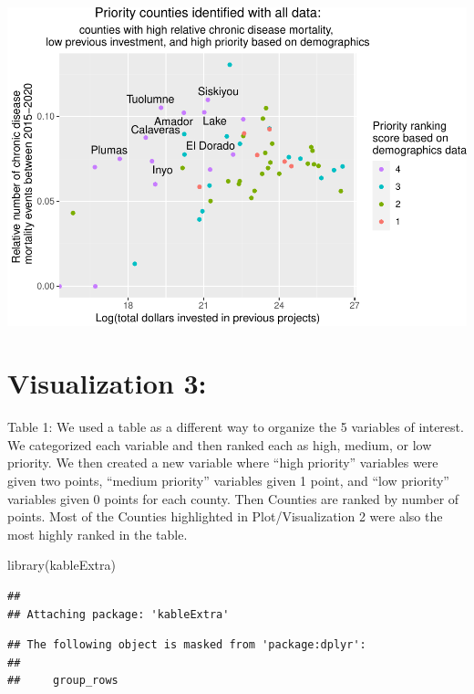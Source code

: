 \documentclass[
]{article}
\newenvironment{Shaded}{\begin{snugshade}}{\end{snugshade}}
\newcommand{\FunctionTok}[1]{\textcolor[rgb]{0.00,0.00,0.00}{#1}}
\newcommand{\NormalTok}[1]{#1}
\begin{document}
\includegraphics{Milestone-4-R-Project_files/figure-latex/unnamed-chunk-7-1.pdf}

\newpage

\hypertarget{visualization-3}{%
\section{Visualization 3:}\label{visualization-3}}

Table 1: We used a table as a different way to organize the 5 variables
of interest. We categorized each variable and then ranked each as high,
medium, or low priority. We then created a new variable where ``high
priority'' variables were given two points, ``medium priority''
variables given 1 point, and ``low priority'' variables given 0 points
for each county. Then Counties are ranked by number of points. Most of
the Counties highlighted in Plot/Visualization 2 were also the most
highly ranked in the table.

\begin{Shaded}
\begin{Highlighting}[]
\FunctionTok{library}\NormalTok{(kableExtra)}
\end{Highlighting}
\end{Shaded}

\begin{verbatim}
## 
## Attaching package: 'kableExtra'
\end{verbatim}

\begin{verbatim}
## The following object is masked from 'package:dplyr':
## 
##     group_rows
\end{verbatim}
\end{document}
